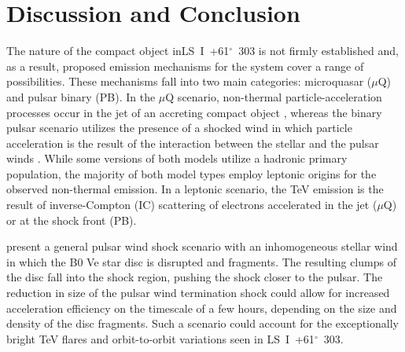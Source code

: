 \documentclass[preprint2]{aastex}
\newcommand{\lsi}{LS~I~+61$^{\circ}$~303}
\begin{document}
\section{Discussion and Conclusion}
The nature of the compact object in\linebreak \lsi{} is not firmly established and, as a result, proposed emission mechanisms for the system cover a range of possibilities. These mechanisms fall into two main categories: microquasar ($\mu$Q) and pulsar binary (PB). In the $\mu$Q scenario, non-thermal particle-acceleration processes occur in the jet of an accreting compact object \citep{Massi2001,Massi2013,2015A&A...575L...9M}, whereas the binary pulsar scenario utilizes the presence of a shocked wind in which particle acceleration is the result of the interaction between the stellar and the pulsar winds \citep{Dhawan2006}. While some versions of both models utilize a hadronic primary population, the  majority of both model types employ leptonic origins for the observed non-thermal emission. In a leptonic scenario, the TeV emission is the result of inverse-Compton (IC) scattering of electrons accelerated in the jet ($\mu$Q) or at the shock front (PB).

\citet{Paredes-Fortuny2014} present a general pulsar wind shock scenario with an inhomogeneous stellar wind in which the B0 Ve star disc is disrupted and fragments. The resulting clumps of the disc fall into the shock region, pushing the shock closer to the pulsar. The reduction in size of the pulsar wind termination shock could allow for increased acceleration efficiency on the timescale of a few hours, depending on the size and density of the disc fragments. Such a scenario could account for the exceptionally bright TeV flares and orbit-to-orbit variations seen in \lsi{}.
\end{document}
